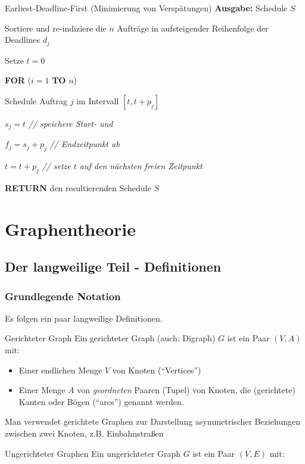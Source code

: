 \documentclass{panikzettel}
\newcommand\tab[1][1cm]{\hspace*{#1}}
\begin{document}
{\begin{algo}{Earliest-Deadline-First (Minimierung von Verspätungen)}
	\textbf{Ausgabe:} Schedule $S$ 
	
	\tcblower
	
	Sortiere und re-indiziere die $n$ Aufträge in aufsteigender Reihenfolge der Deadlines $d_j$
	
	Setze $t=0$
	
	\textbf{FOR} ($i = 1$ \textbf{TO} $n$)
	
	\tab Schedule Auftrag $j$ im Intervall $[t, t+ p_j]$
	
	\tab $s_j = t$ \textit{ \color{gray} // speichere Start- und }
	
	\tab $f_j = s_j + p_j$  \textit{ \color{gray} // Endzeitpunkt ab }
	
	\tab $t = t + p_j$  \textit{ \color{gray} // setze $t$ auf den nächsten freien Zeitpunkt }
	
	
	\textbf{RETURN} den resultierenden Schedule $S$
\end{algo}

\section{Graphentheorie}

\subsection{Der langweilige Teil - Definitionen}

\subsubsection{Grundlegende Notation}

Es folgen ein paar langweilige Definitionen.

\begin{halfboxl}
	\vspace{-\baselineskip}
	\begin{defi}{Gerichteter Graph}
		Ein gerichteter Graph (auch: Digraph) $G$ ist ein Paar $(V,A)$ mit:
		
		\begin{itemize}
			\item Einer endlichen Menge $V$ von Knoten (``Vertices'')
			
			\item Einer Menge $A$ von \emph{geordneten} Paaren (Tupel) von Knoten, die (gerichtete) Kanten oder Bögen (``arcs'') genannt werden.
		\end{itemize}
	
	Man verwendet gerichtete Graphen zur Darstellung asymmetrischer Beziehungen zwischen zwei Knoten, z.B. Einbahnstraßen 
	\end{defi}
\end{halfboxl}%
\begin{halfboxr}
	\vspace{-\baselineskip}
	\begin{defi}{Ungerichteter Graphen}
		Ein ungerichteter Graph $G$ ist ein Paar $(V,E)$ mit:
		

\end{defi}
\end{halfboxr}}
\end{document}
